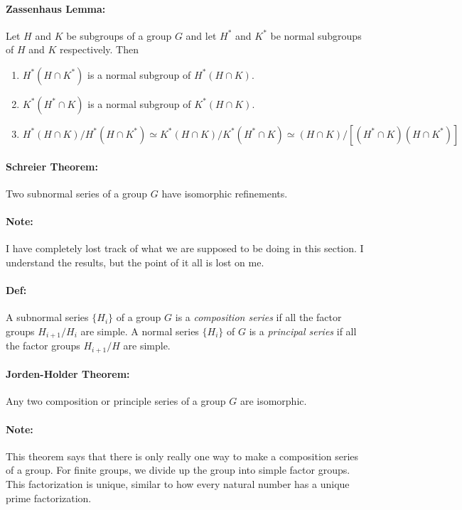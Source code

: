\documentclass[10pt,a4paper]{article}
\begin{document}
\paragraph{Zassenhaus Lemma:} Let $H$ and $K$ be subgroups of a group $G$ and let $H^*$ and $K^*$ be normal subgroups of $H$ and $K$ respectively. Then
\begin{enumerate}
\item $H^*(H \cap K^*)$ is a normal subgroup of $H^*(H \cap K)$.
\item $K^*(H^* \cap K)$ is a normal subgroup of $K^*(H \cap K)$.
\item $H^*(H \cap K)/H^*(H \cap K^*) \simeq K^*(H \cap K)/K^*(H^* \cap K) \simeq (H \cap K)/\left[ (H^* \cap K)(H \cap K^*) \right]$
\end{enumerate}

\paragraph{Schreier Theorem:} Two subnormal series of a group $G$ have isomorphic refinements.

\paragraph{Note:} I have completely lost track of what we are supposed to be doing in this section. I understand the results, but the point of it all is lost on me.

\paragraph{Def:} A subnormal series $\{H_i\}$ of a group $G$ is a \textit{composition series} if all the factor groups $H_{i+1}/H_i$ are simple. A normal series $\{H_i\}$ of $G$ is a \textit{principal series} if all the factor groups $H_{i+1}/H$ are simple.

\paragraph{Jorden-Holder Theorem:} Any two composition or principle series of a group $G$ are isomorphic.

\paragraph{Note:} This theorem says that there is only really one way to make a composition series of a group. For finite groups, we divide up the group into simple factor groups. This factorization is unique, similar to how every natural number has a unique prime factorization.
\end{document}
